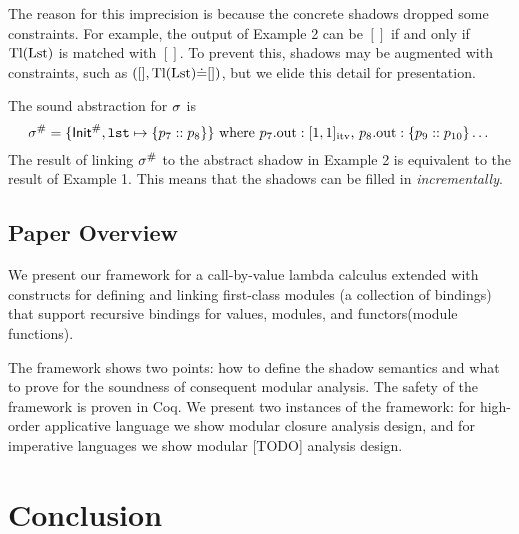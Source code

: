 \documentclass{article}
\begin{document}
The reason for this imprecision is because the concrete shadows dropped some constraints.
For example, the output of Example 2 can be $[]$ if and only if
$\textnormal{Tl}(\text{Lst})$ is matched with $[]$. To prevent this, shadows may be augmented with
constraints, such as $([],\textnormal{Tl}(\text{Lst})\dot{=}[])$, but we elide this detail
for presentation.

The sound abstraction for $\sigma$ is
\[
  {\sigma}^{\#}=\{{\mathsf{Init}}^{\#},\texttt{lst}\mapsto\{p_7::p_8\}\}
  \text{ where }
  p_7.\text{out}:[1,1]_{\text{itv}}
  \text{, }
  p_8.\text{out}:\{p_9::p_{10}\}\dots
\]
The result of linking ${\sigma}^{\#}$ to the abstract shadow in Example 2
is equivalent to the result of Example 1. This means that the
shadows can be filled in \emph{incrementally}.

\subsection{Paper Overview}
We present our framework for a call-by-value lambda calculus extended
with constructs for defining and linking first-class modules (a
collection of bindings) that support recursive bindings for values,
modules, and functors(module functions).

The framework shows two points: how to define the shadow semantics and
what to prove for the soundness of consequent modular analysis. The
safety of the framework is proven in Coq. We present two instances of the
framework: for high-order applicative language we show modular
closure analysis design, and for imperative languages we show modular
  [TODO] analysis design.

\clearpage

\clearpage

\clearpage


\section{Conclusion}
\end{document}
